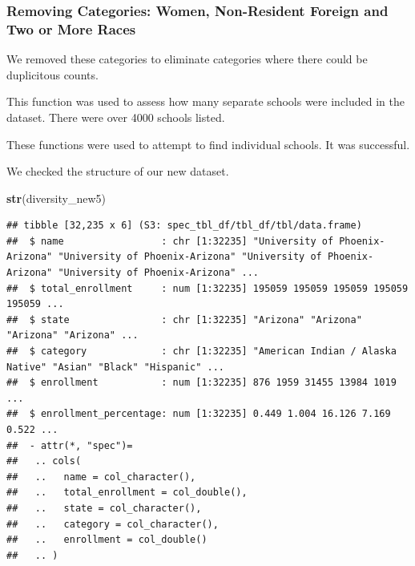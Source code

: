 \documentclass[
]{article}
\newenvironment{Shaded}{\begin{snugshade}}{\end{snugshade}}
\newcommand{\CommentTok}[1]{\textcolor[rgb]{0.56,0.35,0.01}{\textit{#1}}}
\newcommand{\KeywordTok}[1]{\textcolor[rgb]{0.13,0.29,0.53}{\textbf{#1}}}
\newcommand{\NormalTok}[1]{#1}
\newcommand{\OperatorTok}[1]{\textcolor[rgb]{0.81,0.36,0.00}{\textbf{#1}}}
\newcommand{\StringTok}[1]{\textcolor[rgb]{0.31,0.60,0.02}{#1}}
\begin{document}
\hypertarget{removing-categories-women-non-resident-foreign-and-two-or-more-races}{%
\subsubsection{Removing Categories: Women, Non-Resident Foreign and Two
or More
Races}\label{removing-categories-women-non-resident-foreign-and-two-or-more-races}}

We removed these categories to eliminate categories where there could be
duplicitous counts.

\begin{Shaded}
\end{Shaded}

This function was used to assess how many separate schools were included
in the dataset. There were over 4000 schools listed.

\begin{Shaded}
\end{Shaded}

These functions were used to attempt to find individual schools. It was
successful.

We checked the structure of our new dataset.

\begin{Shaded}
\begin{Highlighting}[]
\KeywordTok{str}\NormalTok{(diversity_new5)}
\end{Highlighting}
\end{Shaded}

\begin{verbatim}
## tibble [32,235 x 6] (S3: spec_tbl_df/tbl_df/tbl/data.frame)
##  $ name                 : chr [1:32235] "University of Phoenix-Arizona" "University of Phoenix-Arizona" "University of Phoenix-Arizona" "University of Phoenix-Arizona" ...
##  $ total_enrollment     : num [1:32235] 195059 195059 195059 195059 195059 ...
##  $ state                : chr [1:32235] "Arizona" "Arizona" "Arizona" "Arizona" ...
##  $ category             : chr [1:32235] "American Indian / Alaska Native" "Asian" "Black" "Hispanic" ...
##  $ enrollment           : num [1:32235] 876 1959 31455 13984 1019 ...
##  $ enrollment_percentage: num [1:32235] 0.449 1.004 16.126 7.169 0.522 ...
##  - attr(*, "spec")=
##   .. cols(
##   ..   name = col_character(),
##   ..   total_enrollment = col_double(),
##   ..   state = col_character(),
##   ..   category = col_character(),
##   ..   enrollment = col_double()
##   .. )
\end{verbatim}
\end{document}
